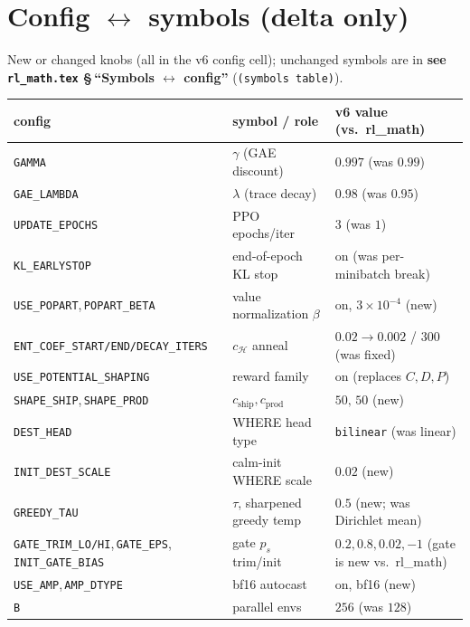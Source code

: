 \documentclass[11pt]{article}
\newcommand{\cd}[1]{\texttt{#1}}
\newcommand{\rlref}[2]{\textbf{see \texttt{rl\_math.tex} \S\,``#1''} (\texttt{#2})}
\begin{document}
\section{Config $\leftrightarrow$ symbols (delta only)}\label{v6:cfg}
New or changed knobs (all in the v6 config cell); unchanged symbols are in
\rlref{Symbols $\leftrightarrow$ config}{(symbols table)}.
\begin{center}\small
\begin{tabular}{@{}lll@{}}
\toprule
config & symbol / role & v6 value (vs.\ rl\_math) \\
\midrule
\cd{GAMMA}                 & $\gamma$ (GAE discount)               & $0.997$ (was $0.99$)\\
\cd{GAE\_LAMBDA}           & $\lambda$ (trace decay)               & $0.98$ (was $0.95$)\\
\cd{UPDATE\_EPOCHS}        & PPO epochs/iter                       & $3$ (was $1$)\\
\cd{KL\_EARLYSTOP}         & end-of-epoch KL stop                  & on (was per-minibatch break)\\
\cd{USE\_POPART},\,\cd{POPART\_BETA} & value normalization $\beta$ & on, $3\!\times\!10^{-4}$ (new)\\
\cd{ENT\_COEF\_START/END/DECAY\_ITERS} & $c_{\mathcal H}$ anneal  & $0.02\!\to\!0.002$ / $300$ (was fixed)\\
\cd{USE\_POTENTIAL\_SHAPING} & reward family                       & on (replaces $C,D,P$)\\
\cd{SHAPE\_SHIP},\,\cd{SHAPE\_PROD} & $c_{\mathrm{ship}},c_{\mathrm{prod}}$ & $50,\,50$ (new)\\
\cd{DEST\_HEAD}            & WHERE head type                       & \cd{bilinear} (was linear)\\
\cd{INIT\_DEST\_SCALE}     & calm-init WHERE scale                 & $0.02$ (new)\\
\cd{GREEDY\_TAU}           & $\tau$, sharpened greedy temp         & $0.5$ (new; was Dirichlet mean)\\
\cd{GATE\_TRIM\_LO/HI},\,\cd{GATE\_EPS},\,\cd{INIT\_GATE\_BIAS} & gate $p_s$ trim/init & $0.2,0.8,0.02,-1$ (gate is new vs.\ rl\_math)\\
\cd{USE\_AMP},\,\cd{AMP\_DTYPE} & bf16 autocast                    & on, bf16 (new)\\
\cd{B} & parallel envs                                              & $256$ (was $128$)\\
\bottomrule
\end{tabular}
\end{center}
\end{document}
